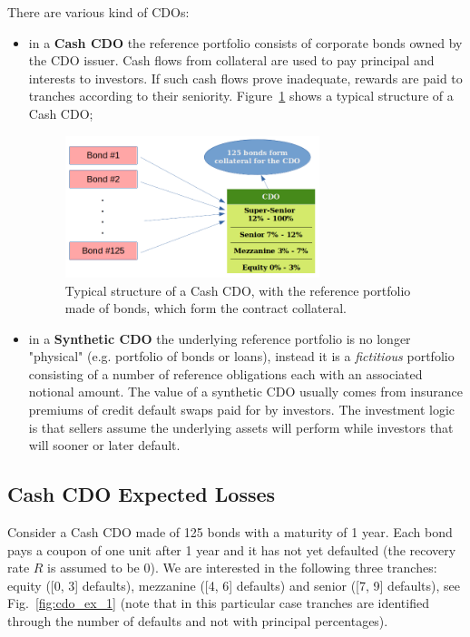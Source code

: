 There are various kind of CDOs:
\begin{itemize}
	\item in a \textbf{Cash CDO} the reference portfolio consists of corporate bonds owned by the CDO issuer. Cash flows from collateral are used to pay principal and interests to investors. If such cash flows prove inadequate, rewards are paid to tranches according to their seniority. Figure~\ref{fig:cdo_structure} shows a typical structure of a Cash CDO;

\begin{figure}[htb]
	\centering
	\includegraphics[width=0.7\textwidth]{figures/cdo_structure}
	\caption{Typical structure of a Cash CDO, with the reference portfolio made of bonds,
		which form the contract collateral.}
	\label{fig:cdo_structure}
\end{figure}

	\item in a \textbf{Synthetic CDO} the underlying reference portfolio is no longer "physical" (e.g. portfolio of bonds or loans), instead it is a \emph{fictitious} portfolio consisting of a number of reference obligations each with an associated notional amount. The value of a synthetic CDO usually comes from insurance premiums of credit default swaps paid for by investors. The investment logic is that sellers assume the underlying assets will perform while investors that will sooner or later default.
\end{itemize}

\subsection{Cash CDO Expected Losses}
\label{sec:expected_losses}

Consider a Cash CDO made of 125 bonds with a maturity of 1 year. Each bond pays a coupon of one unit after 1 year and it has not yet defaulted (the recovery rate $R$ is assumed to be 0). We are interested in the following three tranches: equity ([0, 3] defaults), mezzanine ([4, 6] defaults) and senior ([7, 9] defaults), see Fig.~\ref{fig:cdo_ex_1} (note that in this particular case tranches are identified through the number of defaults and not with principal percentages). 

